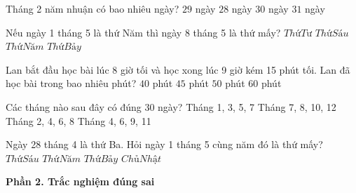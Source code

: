 \begin{ex} %
Tháng 2 năm nhuận có bao nhiêu ngày?
\choice
{\True $29$ ngày}
{$28$ ngày}
{$30$ ngày}
{$31$ ngày}
\end{ex}

\begin{ex} %
Nếu ngày 1 tháng 5 là thứ Năm thì ngày 8 tháng 5 là thứ mấy?
\choice
{$Thứ Tư$}
{$Thứ Sáu$}
{\True $Thứ Năm$}
{$Thứ Bảy$}
\end{ex}

\begin{ex} %
Lan bắt đầu học bài lúc 8 giờ tối và học xong lúc 9 giờ kém 15 phút tối. Lan đã học bài trong bao nhiêu phút?
\choice
{$40$ phút}
{\True $45$ phút}
{$50$ phút}
{$60$ phút}
\end{ex}

\begin{ex} %
Các tháng nào sau đây có đúng 30 ngày?
\choice
{Tháng 1, 3, 5, 7}
{Tháng 7, 8, 10, 12}
{Tháng 2, 4, 6, 8}
{\True Tháng 4, 6, 9, 11}
\end{ex}

\begin{ex} %
Ngày 28 tháng 4 là thứ Ba. Hỏi ngày 1 tháng 5 cùng năm đó là thứ mấy?
\choice
{\True $Thứ Sáu$}
{$Thứ Năm$}
{$Thứ Bảy$}
{$Chủ Nhật$}
\end{ex}

\textbf{Phần 2. Trắc nghiệm đúng sai}

